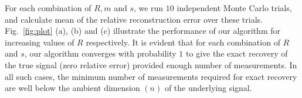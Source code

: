 For each combination of $R, m$ and $s$, we run $10$ independent Monte Carlo trials, and calculate mean of the relative reconstruction error over these trials. Fig.~\ref{fig:plot} (a), (b) and (c) illustrate the performance of our algorithm for increasing values of $R$ respectively. It is evident that for each combination of $R$ and $s$, our algorithm converges with probability $1$ to give the exact recovery of the true signal (zero relative error) provided enough number of measurements. In all such cases, the minimum number of measurements required for exact recovery are well below the ambient dimension $(n)$ of the underlying signal. 

